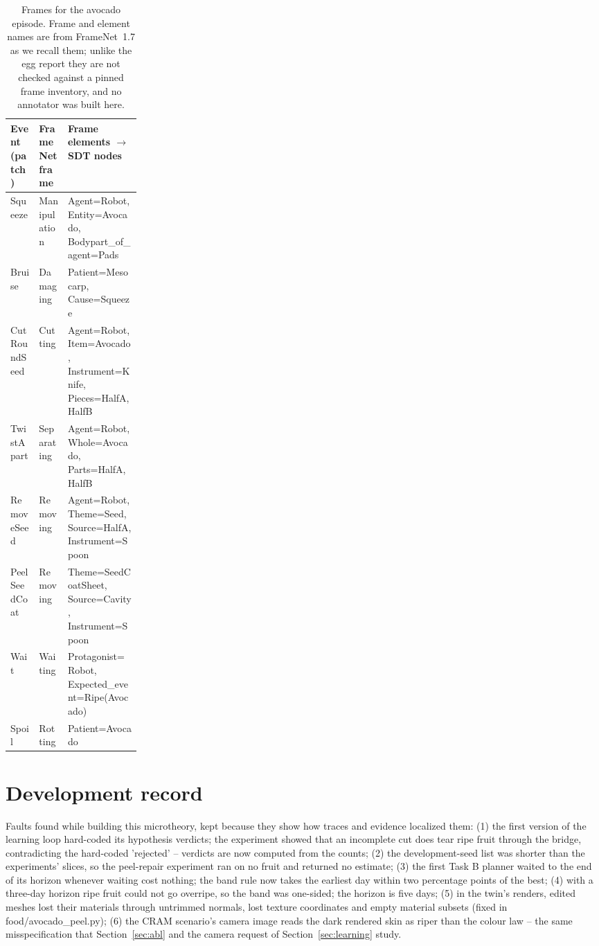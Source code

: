 \documentclass[10.5pt,a4paper]{article}
\begin{document}
\begin{table}[htbp]\centering\scriptsize\caption{Frames for the avocado episode. Frame and element names are from FrameNet~1.7 as we recall them; unlike the egg report they are not checked against a pinned frame inventory, and no annotator was built here.}
\begin{tabularx}{\linewidth}{@{}lp{0.22\linewidth}X@{}}\toprule Event (patch) & FrameNet frame & Frame elements $\to$ SDT nodes \\\midrule
Squeeze & Manipulation & Agent=Robot, Entity=Avocado, Bodypart\_of\_agent=Pads \\
Bruise & Damaging & Patient=Mesocarp, Cause=Squeeze \\
CutRoundSeed & Cutting & Agent=Robot, Item=Avocado, Instrument=Knife, Pieces=HalfA, HalfB \\
TwistApart & Separating & Agent=Robot, Whole=Avocado, Parts=HalfA, HalfB \\
RemoveSeed & Removing & Agent=Robot, Theme=Seed, Source=HalfA, Instrument=Spoon \\
PeelSeedCoat & Removing & Theme=SeedCoatSheet, Source=Cavity, Instrument=Spoon \\
Wait & Waiting & Protagonist=Robot, Expected\_event=Ripe(Avocado) \\
Spoil & Rotting & Patient=Avocado \\\bottomrule\end{tabularx}\end{table}
\section{Development record}
Faults found while building this microtheory, kept because they show how traces and evidence localized them:
(1) the first version of the learning loop hard-coded its hypothesis verdicts; the experiment showed that an
incomplete cut does tear ripe fruit through the bridge, contradicting the hard-coded 'rejected' -- verdicts are now
computed from the counts; (2) the development-seed list was shorter than the experiments' slices, so the peel-repair
experiment ran on no fruit and returned no estimate; (3) the first Task B planner waited to the end of its horizon
whenever waiting cost nothing; the band rule now takes the earliest day within two percentage points of the best; (4)
with a three-day horizon ripe fruit could not go overripe, so the band was one-sided; the horizon is five days; (5)
in the twin's renders, edited meshes lost their materials through untrimmed normals, lost texture coordinates and
empty material subsets (fixed in food/avocado\_peel.py); (6) the CRAM scenario's camera image reads the dark rendered
skin as riper than the colour law -- the same misspecification that Section~\ref{sec:abl} and the camera request of
Section~\ref{sec:learning} study.
\end{document}
